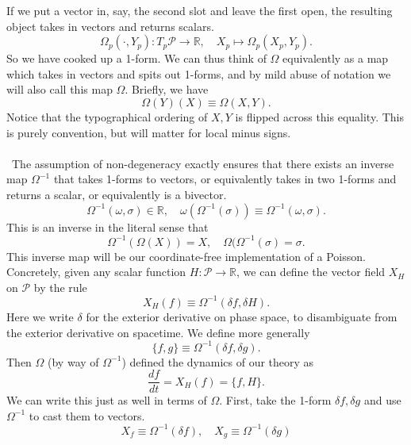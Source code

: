 \documentclass[11pt,letterpaper]{article}
\newcommand{\LP}{\left(}
\newcommand{\RP}{\right)}
\newcommand{\mc}[1]{\mathcal{#1}}
\newcommand{\R}{\mathbb{R}}
\begin{document}
If we put a vector in, say, the second slot and leave the first open, the resulting object takes in vectors and returns scalars. \begin{equation}
\Omega_p( \cdot, Y_p): T_p \mc{P} \to \R, \quad X_p \mapsto \Omega_p(X_p, Y_p).
\end{equation}
So we have cooked up a 1-form. We can thus think of $\Omega$ equivalently as a map which takes in vectors and spits out 1-forms, and by mild abuse of notation we will also call this map $\Omega$. Briefly, we have \begin{equation}
\Omega(Y) (X) \equiv \Omega(X,Y).
\end{equation}
Notice that the typographical ordering of $X,Y$ is flipped across this equality. This is purely convention, but will matter for local minus signs. \\
\\
\
The assumption of non-degeneracy exactly ensures that there exists an inverse map $\Omega^{-1}$ that takes 1-forms to vectors, or equivalently takes in two 1-forms and returns a scalar, or equivalently is a bivector. \begin{equation}
\Omega^{-1} (\omega, \sigma) \in \R, \quad \omega \LP \Omega^{-1} (\sigma) \RP \equiv \Omega^{-1} (\omega, \sigma).
\end{equation}
This is an inverse in the literal sense that \begin{equation}
\Omega^{-1} (\Omega(X)) = X, \quad \Omega(\Omega^{-1}(\sigma) = \sigma.
\end{equation}
This inverse map will be our coordinate-free implementation of a Poisson. Concretely, given any scalar function $H: \mc{P} \to \R$, we can define the vector field $X_H$ on $\mc{P}$ by the rule \begin{equation}
X_H(f) \equiv \Omega^{-1} (\delta f, \delta H).
\end{equation}
Here we write $\delta$ for the exterior derivative on phase space, to disambiguate from the exterior derivative on spacetime. We define more generally \begin{equation}
\{f, g \} \equiv \Omega^{-1} (\delta f, \delta g).
\end{equation}
Then $\Omega$ (by way of $\Omega^{-1}$) defined the dynamics of our theory as \begin{equation}
\frac{df}{dt} = X_H(f) = \{f, H\}.
\end{equation}
We can write this just as well in terms of $\Omega$. First, take the 1-form $\delta f, \delta g$ and use $\Omega^{-1}$ to cast them to vectors. \begin{equation}
X_f \equiv \Omega^{-1} (\delta f), \quad X_g \equiv \Omega^{-1} (\delta g)
\end{equation}
\end{document}
